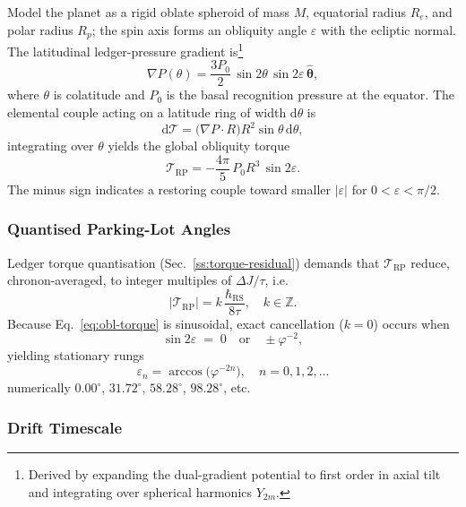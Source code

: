 \documentclass[11pt,oneside]{book}
\begin{document}
Model the planet as a rigid oblate spheroid of mass $M$,
equatorial radius $R_{\!e}$, and polar radius $R_{\!p}$; the spin axis
forms an obliquity angle $\varepsilon$ with the ecliptic normal.
The latitudinal ledger-pressure gradient is\footnote{Derived by
expanding the dual-gradient potential to first order in axial tilt and
integrating over spherical harmonics $Y_{2m}$.}
\begin{equation}
   \nabla P(\theta)
   = \frac{3P_{0}}{2}\,\sin2\theta\,\sin2\varepsilon\,
     \hat{\boldsymbol\theta},
   \label{eq:dP}
\end{equation}
where $\theta$ is colatitude and $P_{0}$ is the basal recognition
pressure at the equator.
The elemental couple acting on a latitude ring of width
$\mathrm d\theta$ is
\[
   \mathrm d\mathcal T
   = \bigl(\nabla P\cdot R\bigr) R^{2}\sin\theta\,\mathrm d\theta,
\]
integrating over $\theta$ yields the global obliquity torque
\begin{equation}
   \mathcal T_{\!\text{RP}}
   = -\frac{4\pi}{5}\,P_{0}R^{3}\,\sin2\varepsilon.
   \label{eq:obl-torque}
\end{equation}
The minus sign indicates a restoring couple toward smaller
$|\varepsilon|$ for $0<\varepsilon<\pi/2$.

\subsubsection{Quantised Parking-Lot Angles}
\label{ss:obl-rungs}

Ledger torque quantisation (Sec.~\ref{ss:torque-residual}) demands that
$\mathcal T_{\!\text{RP}}$ reduce, chronon-averaged, to integer
multiples of $\Delta J/\tau$, i.e.
\[
   \left|\mathcal T_{\!\text{RP}}\right|
   = k\,\frac{\hbar_{\mathrm{RS}}}{8\tau},
   \quad k\in\mathbb Z.
\]
Because Eq.~\eqref{eq:obl-torque} is sinusoidal, exact cancellation
($k=0$) occurs when
\[
   \sin2\varepsilon
   \;=\;
   0
   \quad\text{or}\quad
   \pm\varphi^{-2},
\]
yielding stationary rungs
\begin{equation}
   \boxed{\;
      \varepsilon_{n}
      = \arccos\!\bigl(\varphi^{-2n}\bigr),
      \quad n=0,1,2,\dots
      \;}
   \label{eq:obl-rungs}
\end{equation}
numerically $0.00^{\circ}$, $31.72^{\circ}$, $58.28^{\circ}$,
$98.28^{\circ}$, etc.

\subsubsection{Drift Timescale}
\label{ss:obl-timescale}
\end{document}
